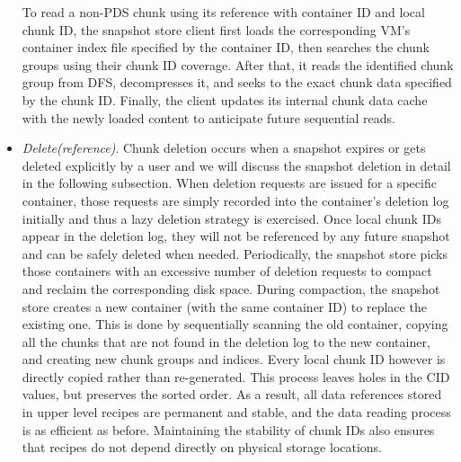 \begin{itemize}
To read a non-PDS chunk using its reference with container ID and local chunk ID,  the snapshot store client first loads the
corresponding VM's container index file specified by the container ID, then searches the chunk
groups  using their  chunk ID coverage.
After that, it reads the identified chunk group from DFS, decompresses it, and seeks to the exact chunk data 
specified by the chunk ID. 
Finally, the client updates its internal chunk data cache with the newly loaded content to 
anticipate future sequential reads.
\item {\em Delete(reference)}.
Chunk deletion occurs when a snapshot expires or gets deleted explicitly by a user
and we will discuss the snapshot deletion in detail in the following subsection.
When deletion requests are issued for a specific container,
those requests are simply recorded into the  container's deletion log initially and thus  a lazy
deletion strategy is exercised.
Once local chunk IDs appear in
the deletion log, they will not be referenced by any future snapshot and can be safely deleted when needed. 
Periodically, the snapshot  store picks those containers with an excessive
number of deletion requests to  compact and  reclaim the corresponding disk space. 
During compaction, the snapshot store creates a new container (with the same container ID) to replace the 
existing one. This is done by sequentially scanning the old container, copying all the chunks that are not 
found in the deletion log to the new container, and creating new chunk groups and indices. 
Every local chunk ID however is directly copied rather than re-generated. This
process leaves holes in the CID values, but preserves the sorted order.
As a result, all data references stored 
in upper level recipes are permanent and stable, and the data reading process
is as efficient as before. Maintaining the stability of chunk IDs also ensures that recipes do not
depend directly on physical storage locations.
\end{itemize}

%

